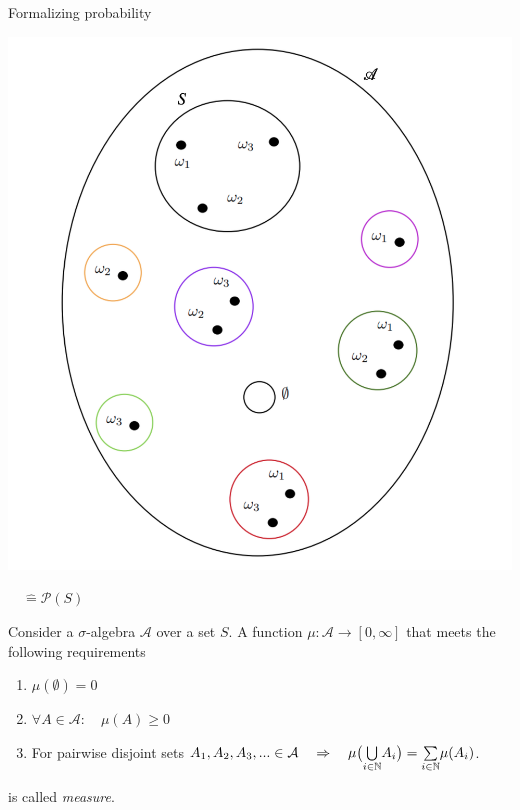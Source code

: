 \documentclass[a4,11pt]{beamer}
\newlength{\wideitemsep}
\let\olditem\item
\renewcommand{\item}{\setlength{\itemsep}{\wideitemsep}\olditem}
\begin{document}
\begin{frame}[allowframebreaks]{Formalizing probability}
\begin{minipage}{.6\linewidth}
    \includegraphics[width=\linewidth]{graphics/SigmaAlgebra.png}
    \end{minipage}%
    \begin{minipage}{.2\linewidth}
        $\quad \hat{=}\mathcal{P}(S)$
    \end{minipage}

    \begin{definition}[Measure]
        Consider a $\sigma$-algebra $\mathcal{A}$ over a set $S$. A function $\mu:\mathcal{A}\longrightarrow [0,\infty]$ that meets the following requirements
        \begin{enumerate}
            \item $\mu(\emptyset)=0$\vspace{-.5cm}\\
            \item $\forall A\in\mathcal{A}: \quad \mu(A)\geq 0$\vspace{-.5cm}\\
            \item For pairwise disjoint sets $A_1,A_2,A_3,...\in\mathcal{A}\quad\Rightarrow\quad\mu\big(\underset{i\in\mathbb{N}}{\bigcup}A_i\big)=\underset{i\in\mathbb{N}}{\sum}\mu(A_i)$.
        \end{enumerate} is called \emph{measure}.
        

\end{definition}
\end{frame}
\end{document}
